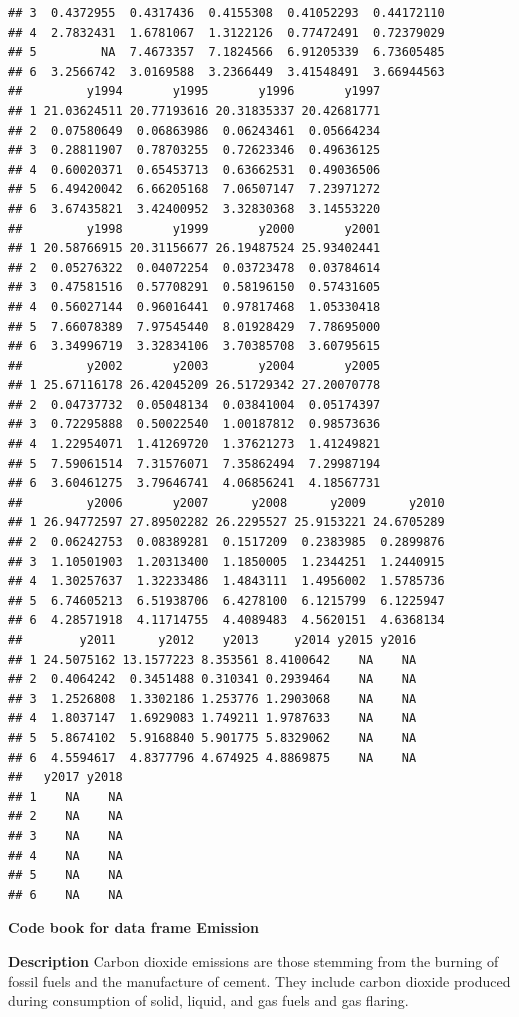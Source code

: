 \documentclass[
]{book}
\begin{document}
\begin{verbatim}
## 3  0.4372955  0.4317436  0.4155308  0.41052293  0.44172110
## 4  2.7832431  1.6781067  1.3122126  0.77472491  0.72379029
## 5         NA  7.4673357  7.1824566  6.91205339  6.73605485
## 6  3.2566742  3.0169588  3.2366449  3.41548491  3.66944563
##         y1994       y1995       y1996       y1997
## 1 21.03624511 20.77193616 20.31835337 20.42681771
## 2  0.07580649  0.06863986  0.06243461  0.05664234
## 3  0.28811907  0.78703255  0.72623346  0.49636125
## 4  0.60020371  0.65453713  0.63662531  0.49036506
## 5  6.49420042  6.66205168  7.06507147  7.23971272
## 6  3.67435821  3.42400952  3.32830368  3.14553220
##         y1998       y1999       y2000       y2001
## 1 20.58766915 20.31156677 26.19487524 25.93402441
## 2  0.05276322  0.04072254  0.03723478  0.03784614
## 3  0.47581516  0.57708291  0.58196150  0.57431605
## 4  0.56027144  0.96016441  0.97817468  1.05330418
## 5  7.66078389  7.97545440  8.01928429  7.78695000
## 6  3.34996719  3.32834106  3.70385708  3.60795615
##         y2002       y2003       y2004       y2005
## 1 25.67116178 26.42045209 26.51729342 27.20070778
## 2  0.04737732  0.05048134  0.03841004  0.05174397
## 3  0.72295888  0.50022540  1.00187812  0.98573636
## 4  1.22954071  1.41269720  1.37621273  1.41249821
## 5  7.59061514  7.31576071  7.35862494  7.29987194
## 6  3.60461275  3.79646741  4.06856241  4.18567731
##         y2006       y2007      y2008      y2009      y2010
## 1 26.94772597 27.89502282 26.2295527 25.9153221 24.6705289
## 2  0.06242753  0.08389281  0.1517209  0.2383985  0.2899876
## 3  1.10501903  1.20313400  1.1850005  1.2344251  1.2440915
## 4  1.30257637  1.32233486  1.4843111  1.4956002  1.5785736
## 5  6.74605213  6.51938706  6.4278100  6.1215799  6.1225947
## 6  4.28571918  4.11714755  4.4089483  4.5620151  4.6368134
##        y2011      y2012    y2013     y2014 y2015 y2016
## 1 24.5075162 13.1577223 8.353561 8.4100642    NA    NA
## 2  0.4064242  0.3451488 0.310341 0.2939464    NA    NA
## 3  1.2526808  1.3302186 1.253776 1.2903068    NA    NA
## 4  1.8037147  1.6929083 1.749211 1.9787633    NA    NA
## 5  5.8674102  5.9168840 5.901775 5.8329062    NA    NA
## 6  4.5594617  4.8377796 4.674925 4.8869875    NA    NA
##   y2017 y2018
## 1    NA    NA
## 2    NA    NA
## 3    NA    NA
## 4    NA    NA
## 5    NA    NA
## 6    NA    NA
\end{verbatim}

\textbf{Code book for data frame Emission}

\textbf{Description}
Carbon dioxide emissions are those stemming from the burning of fossil fuels and the manufacture of cement. They include carbon dioxide produced during consumption of solid, liquid, and gas fuels and gas flaring.
\end{document}
